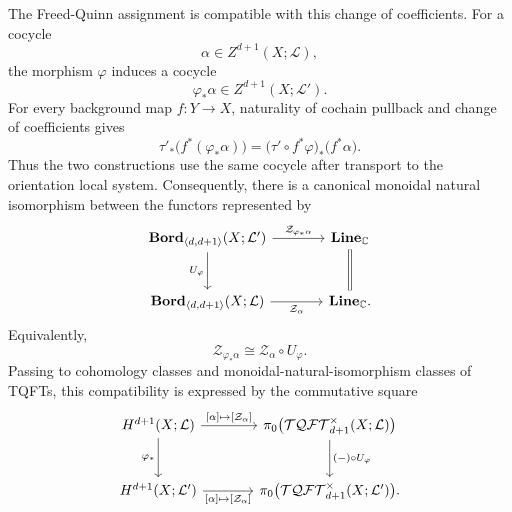 \documentclass[aps,prx,reprint,superscriptaddress,twocolumn,amsmath,amssymb,amsfonts, nofootinbib]{revtex4-2}
\newcommand{\bordd}{{\bf Bord}_{\langle d, d+1\rangle}}
\newcommand{\Line}{{\bf Line}_{\mathbb{C}}}
\newcommand{\tqftd}{\mathcal{TQFT}_{d+1}}
\theoremstyle{apsstyle}
\begin{document}
\bigskip 

The Freed-Quinn assignment is compatible with this change of coefficients. For a cocycle
\begin{equation*}
    \alpha\in Z^{d+1}(X;\mathcal L),
\end{equation*}
the morphism $\varphi$ induces a cocycle
\begin{equation*}
    \varphi_*\alpha
    \in
    Z^{d+1}(X;\mathcal L').
\end{equation*}
For every background map $f:Y\to X$, naturality of cochain pullback and change of coefficients gives
\begin{equation}
    \tau'_*
    \bigl(f^*(\varphi_*\alpha)\bigr)
    =
    \bigl(\tau'\circ f^*\varphi\bigr)_*
    \bigl(f^*\alpha\bigr).
    \label{eq:FQ_coefficient_naturality}
\end{equation}
Thus the two constructions use the same cocycle after transport to the orientation local system. Consequently, there is a canonical monoidal natural isomorphism between the functors represented by
\begin{equation}
\begin{tikzcd}[column sep=large,row sep=large]
\bordd(X;\mathcal L')
\arrow[r,"\mathcal Z_{\varphi_*\alpha}"]
\arrow[d,"U_\varphi"']
&
\Line
\arrow[d,equal]
\\
\bordd(X;\mathcal L)
\arrow[r,"\mathcal Z_\alpha"']
&
\Line .
\end{tikzcd}
\end{equation}
Equivalently,
\begin{equation}
    \mathcal Z_{\varphi_*\alpha}
    \cong
    \mathcal Z_\alpha\circ U_\varphi.
    \label{eq:FQ_coefficient_natural_isomorphism}
\end{equation}
Passing to cohomology classes and monoidal-natural-isomorphism classes of TQFTs, this compatibility is expressed by the commutative square
\begin{equation}
\label{eq:bord_nat_sq2}
\begin{tikzcd}[column sep=large,row sep=large]
H^{d+1}(X;\mathcal L) \arrow[r,"\text{[}\alpha\text{]}\mapsto \text{[}\mathcal Z_\alpha\text{]}"]
\arrow[d,"\varphi_*"'] & \pi_0\bigl(\tqftd^\times(X;\mathcal L)\bigr)
\arrow[d,"(-)\circ U_\varphi"]
\\
H^{d+1}(X;\mathcal L') \arrow[r,"\text{[}\alpha\text{]}\mapsto\text{[}\mathcal Z_\alpha\text{]}"']
& \pi_0\bigl(\tqftd^\times(X;\mathcal L')\bigr).
\end{tikzcd}
\end{equation}
\end{document}
